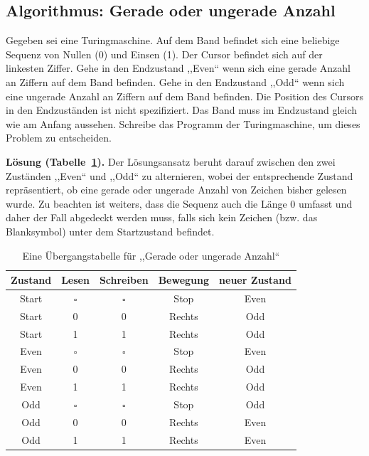 \subsection{Algorithmus: Gerade oder ungerade Anzahl}
%
Gegeben sei eine Turingmaschine. Auf dem Band befindet sich eine beliebige Sequenz von Nullen (0) und Einsen (1). Der Cursor befindet sich auf der linkesten Ziffer. Gehe in den Endzustand ,,Even`` wenn sich eine gerade Anzahl an Ziffern auf dem Band befinden. Gehe in den Endzustand ,,Odd`` wenn sich eine ungerade Anzahl an Ziffern auf dem Band befinden. Die Position des Cursors in den Endzuständen ist nicht spezifiziert. Das Band muss im Endzustand gleich wie am Anfang aussehen. Schreibe das Programm der Turingmaschine, um dieses Problem zu entscheiden.

\textbf{Lösung (Tabelle~\ref{tab:odd_even}).} Der Lösungsansatz beruht darauf zwischen den zwei Zuständen ,,Even`` und ,,Odd`` zu alternieren, wobei der entsprechende Zustand repräsentiert, ob eine gerade oder ungerade Anzahl von Zeichen bisher gelesen wurde. Zu beachten ist weiters, dass die Sequenz auch die Länge $0$ umfasst und daher der Fall abgedeckt werden muss, falls sich kein Zeichen (bzw. das Blanksymbol) unter dem Startzustand befindet.
%
\begin{table}
 \begin{center}
  \begin{tabular}{ccccc}
   \hline
    Zustand & Lesen     & Schreiben & Bewegung & neuer Zustand \\
   \hline \hline
    Start   & $\square$ & $\square$ & Stop     & Even \\
    Start   & 0         & 0         & Rechts   & Odd \\
    Start   & 1         & 1         & Rechts   & Odd \\
    Even    & $\square$ & $\square$ & Stop     & Even \\
    Even    & 0         & 0         & Rechts   & Odd \\
    Even    & 1         & 1         & Rechts   & Odd \\
    Odd     & $\square$ & $\square$ & Stop     & Odd \\
    Odd     & 0         & 0         & Rechts   & Even \\
    Odd     & 1         & 1         & Rechts   & Even \\
   \hline
  \end{tabular}
  \caption{Eine Übergangstabelle für ,,Gerade oder ungerade Anzahl``}
  \label{tab:odd_even}
 \end{center}
\end{table}

